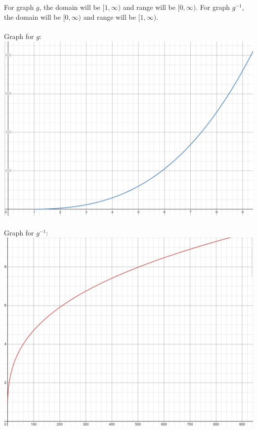 \documentclass[]{article}
\begin{document}
\begin{enumerate}
    \\\\ For graph $g$, the domain will be $[1,\infty)$ and range will be $[0,\infty)$. For graph $g^{-1}$, the domain will be $[0,\infty)$ and range will be $[1,\infty)$.
    \\\\ Graph for $g$:
    \newline \includegraphics[scale=0.5]{Munkres6G.png}
    \\\\ Graph for $g^{-1}$:
    \newline \includegraphics[scale=0.5]{Munkres6GInverse.png}
    
\end{enumerate}
\end{document}
